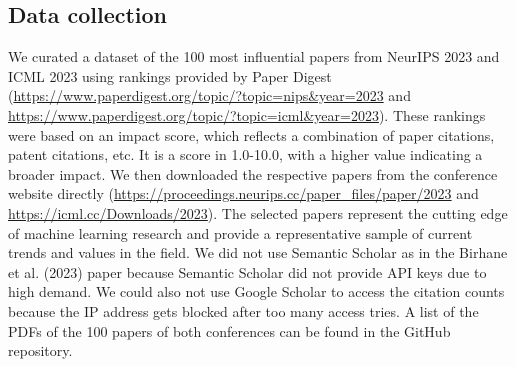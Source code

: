\documentclass{article}
\begin{document}
\subsection{Data collection}
We curated a dataset of the 100 most influential papers from NeurIPS 2023 and ICML 2023 using rankings provided by Paper Digest 
(\url{https://www.paperdigest.org/topic/?topic=nips&year=2023} and \url{https://www.paperdigest.org/topic/?topic=icml&year=2023}). 
These rankings were based on an impact score, which reflects a combination of paper citations, patent citations, etc. It is a score in 1.0-10.0, 
with a higher value indicating a broader impact. We then downloaded the respective papers from the conference website directly 
(\url{https://proceedings.neurips.cc/paper_files/paper/2023} and \url{https://icml.cc/Downloads/2023}). 
The selected papers represent the cutting edge of machine 
learning research and provide a representative sample of current trends and values in the field. We did not use Semantic Scholar as in the Birhane et 
al. (2023) paper because Semantic Scholar did not provide API keys due to high demand. We could also not use Google Scholar to access the citation 
counts because the IP address gets blocked after too many access tries. A list of the PDFs of the 100 papers of both conferences can be found in the 
GitHub repository.
\end{document}
